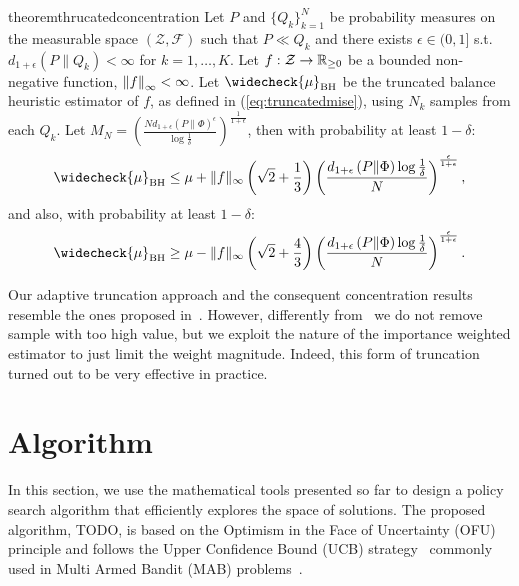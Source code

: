 \documentclass{article}
\makeatletter
\DeclareRobustCommand{\algoname}{TODO\@\xspace}
\makeatother
\begin{document}
\begin{restatable}{theorem}{thrucatedconcentration}\label{lem:thrucatedconcentration}
	Let $P$ and $\{ Q_k \}_{k=1}^N$ be probability measures on the measurable space $(\mathcal{Z},\mathcal{F})$ such that $P\ll Q_k$ and there exists $\epsilon \in (0,1]$ s.t. $d_{1+\epsilon}(P\|Q_k)<\infty$ for $k=1,\dots,K$. Let $f:\mathcal{Z}\to\Reals_{\ge 0}$ be a bounded non-negative function, \ie $\norm[\infty]{f}<\infty$. Let $\widecheck{\mu}_{\text{BH}}$ be the truncated balance heuristic estimator of $f$, as defined in (\ref{eq:truncatedmise}), using $N_k$ \iid samples from each $Q_k$. 
	Let $M_N = \left( \frac{N d_{1+\epsilon}\left( P \| \Phi  \right)^{\epsilon} }{\log \frac{1}{\delta}} \right) ^{\frac{1}{1+\epsilon}}$, then with probability at least $1-\delta$:
    \begin{equation}\label{eq:1.1}
        \widecheck{\mu}_{\text{BH}} \le \mu + \|f\|_{\infty} \left(\sqrt{2} + \frac{1}{3} \right)  \left(\frac{ d_{1+\epsilon}\left( P \| \Phi  \right) \log  \frac{1}{\delta}  }{N} \right)^{\frac{\epsilon}{1+\epsilon}},
    \end{equation}
    and also, with probability at least $1-\delta$:
    \begin{equation}\label{eq:1.2}
        \widecheck{\mu}_{\text{BH}} \ge \mu - \|f\|_{\infty} \left(\sqrt{2} + \frac{4}{3} \right) \left(\frac{ d_{1+\epsilon}\left( P \| \Phi  \right) \log  \frac{1}{\delta}  }{N} \right)^{\frac{\epsilon}{1+\epsilon}}.
    \end{equation}
\end{restatable}

Our adaptive truncation approach and the consequent concentration results resemble the ones proposed in~\cite{bubeck2013bandits}. However, differently from~\cite{bubeck2013bandits} we do not remove sample with too high value, but we exploit the nature of the importance weighted estimator to just limit the weight magnitude. Indeed, this form of truncation turned out to be very effective in practice.


\section{Algorithm}
In this section, we use the mathematical tools presented so far to design a policy search algorithm that efficiently explores the space of solutions. The proposed algorithm, \algoname, is based on the Optimism in the Face of Uncertainty (OFU) principle and follows the Upper Confidence Bound (UCB) strategy~\citep{lai1985asymptotically,agrawal1995sample,auer2002finite} commonly used in Multi Armed Bandit (MAB) problems~\citep{robbins1985some,bubeck2012regret,lattimore2019bandit}. 
\end{document}
